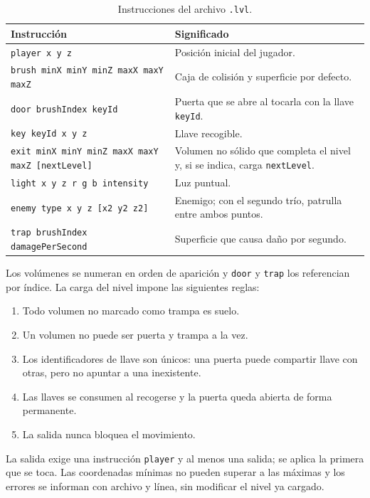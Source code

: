 \documentclass[12pt,a4paper]{article}
\begin{document}
\begin{table}[htbp]
  \centering
  \footnotesize
  \begin{tabular}{@{}>{\raggedright\arraybackslash}p{}>{\raggedright\arraybackslash}p{}@{}}
    \toprule
    Instrucción & Significado \\
    \midrule
    \texttt{player x y z} & Posición inicial del jugador. \\
    \texttt{brush minX minY minZ maxX maxY maxZ} &
      Caja de colisión y superficie por defecto. \\
    \texttt{door brushIndex keyId} &
      Puerta que se abre al tocarla con la llave \texttt{keyId}. \\
    \texttt{key keyId x y z} & Llave recogible. \\
    \texttt{exit minX minY minZ maxX maxY maxZ [nextLevel]} &
      Volumen no sólido que completa el nivel y, si se indica, carga
      \texttt{nextLevel}. \\
    \texttt{light x y z r g b intensity} & Luz puntual. \\
    \texttt{enemy type x y z [x2 y2 z2]} &
      Enemigo; con el segundo trío, patrulla entre ambos puntos. \\
    \texttt{trap brushIndex damagePerSecond} &
      Superficie que causa daño por segundo. \\
    \bottomrule
  \end{tabular}
  \caption{Instrucciones del archivo \texttt{.lvl}.}
  \label{tab:lvl}
\end{table}

Los volúmenes se numeran en orden de aparición y \texttt{door} y \texttt{trap}
los referencian por índice. La carga del nivel impone las siguientes reglas:

\begin{enumerate}
  \item Todo volumen no marcado como trampa es suelo.
  \item Un volumen no puede ser puerta y trampa a la vez.
  \item Los identificadores de llave son únicos: una puerta puede compartir
        llave con otras, pero no apuntar a una inexistente.
  \item Las llaves se consumen al recogerse y la puerta queda abierta de forma
        permanente.
  \item La salida nunca bloquea el movimiento.
\end{enumerate}

La salida exige una instrucción \texttt{player} y al menos una salida; se aplica
la primera que se toca. Las coordenadas mínimas no pueden superar a las máximas
y los errores se informan con archivo y línea, sin modificar el nivel ya
cargado.
\end{document}
